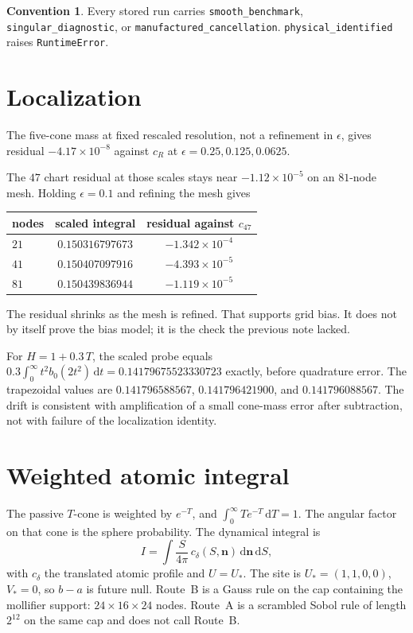 \documentclass[11pt,letterpaper]{article}
\numberwithin{equation}{section}
\theoremstyle{definition}
\newtheorem{convention}[proposition]{Convention}
\begin{document}
\begin{convention}
Every stored run carries \texttt{smooth\_benchmark},
\texttt{singular\_diagnostic}, or
\texttt{manufactured\_cancellation}.
\texttt{physical\_identified} raises \texttt{RuntimeError}.
\end{convention}

\section{Localization}
The five-cone mass at fixed rescaled resolution, not a refinement
in \(\epsilon\), gives residual \(-4.17\times 10^{-8}\) against
\(c_R\) at \(\epsilon=0.25,0.125,0.0625\).

The \(47\) chart residual at those scales stays near
\(-1.12\times 10^{-5}\) on an \(81\)-node mesh.
Holding \(\epsilon=0.1\) and refining the mesh gives
\begin{center}
\small
\begin{tabular}{lcc}
\toprule
nodes & scaled integral & residual against \(c_{47}\)\\
\midrule
\(21\) & \(0.150316797673\) & \(-1.342\times 10^{-4}\)\\
\(41\) & \(0.150407097916\) & \(-4.393\times 10^{-5}\)\\
\(81\) & \(0.150439836944\) & \(-1.119\times 10^{-5}\)\\
\bottomrule
\end{tabular}
\end{center}
The residual shrinks as the mesh is refined. That supports grid
bias. It does not by itself prove the bias model; it is the check
the previous note lacked.

For \(H=1+0.3\,T\), the scaled probe equals
\(0.3\int_0^\infty t^2 b_0(2t^2)\,\mathrm d t
=0.14179675523330723\)
exactly, before quadrature error.
The trapezoidal values are
\(0.141796588567\), \(0.141796421900\), and \(0.141796088567\).
The drift is consistent with amplification of a small cone-mass
error after subtraction, not with failure of the localization
identity.

\section{Weighted atomic integral}
The passive \(T\)-cone is weighted by \(e^{-T}\), and
\(\int_0^\infty T e^{-T}\,\mathrm d T=1\).
The angular factor on that cone is the sphere probability.
The dynamical integral is
\begin{equation}
 I=\int \frac{S}{4\pi}\,c_\delta(S,\mathbf n)\,\mathrm d\mathbf n\,\mathrm d S,
\end{equation}
with \(c_\delta\) the translated atomic profile and \(U=U_*\).
The site is \(U_*=(1,1,0,0)\), \(V_*=0\), so \(b-a\) is future null.
Route~B is a Gauss rule on the cap containing the mollifier
support: \(24\times 16\times 24\) nodes.
Route~A is a scrambled Sobol rule of length \(2^{12}\) on the same
cap and does not call Route~B.
\end{document}
